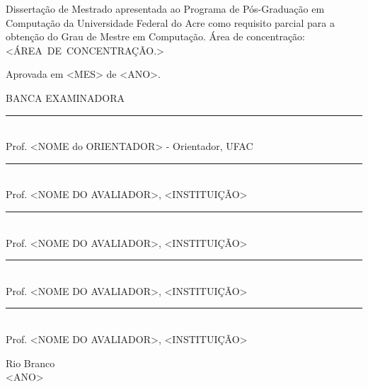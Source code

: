\noindent
\begin{flushright}
\begin{minipage}[t]{8cm}

Dissertação de Mestrado apresentada ao Programa de P\'{o}s-Gradua\c{c}\~{a}o em Computa\c{c}\~{a}o da Universidade Federal do Acre como requisito parcial para a obten\c{c}\~{a}o do \mbox{Grau} de Mestre em Computa\c{c}\~{a}o. \'{A}rea de concentra\c{c}\~{a}o: \mbox{<\'AREA DE CONCENTRA\c{C}\~AO.>} %

\end{minipage}
\end{flushright}
\vspace{1.0 cm}
\noindent
Aprovada em <MES> de <ANO>. \\
\begin{flushright}
  \parbox{11cm}
  {
  \begin{center}
  BANCA EXAMINADORA \\
  \vspace{6mm}
  \rule{11cm}{.1mm} \\
    Prof. <NOME do ORIENTADOR> - Orientador, UFAC \\
    \vspace{6mm}
  \rule{11cm}{.1mm} \\
    Prof. <NOME DO AVALIADOR>, <INSTITUI\c{C}\~AO>\\
    \vspace{6mm}
  \rule{11cm}{.1mm} \\
    Prof. <NOME DO AVALIADOR>, <INSTITUI\c{C}\~AO>\\
  \vspace{4mm}
  \rule{11cm}{.1mm} \\
    Prof. <NOME DO AVALIADOR>, <INSTITUI\c{C}\~AO>\\
    \vspace{6mm}
  \rule{11cm}{.1mm} \\
    Prof. <NOME DO AVALIADOR>, <INSTITUI\c{C}\~AO>\\
  \vspace{6mm}
  \end{center}
  }
\end{flushright}
\begin{center}
  \vspace{4mm}
  Rio Branco \\
  <ANO>

\end{center}

